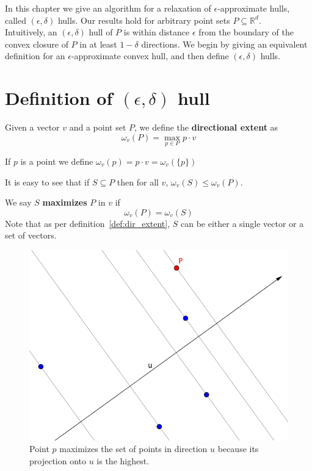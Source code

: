 
In this chapter we give an algorithm for a relaxation of $\epsilon$-approximate hulls, called $(\epsilon, \delta)$ hulls. Our results hold for arbitrary point sets $P \subseteq \mathbb{R}^d$.
\\

Intuitively, an $(\epsilon,\delta)$ hull of $P$ is within distance $\epsilon$ from the boundary of the convex closure of $P$ in at least $1-\delta$ directions. We begin by giving an equivalent definition for an $\epsilon$-approximate convex hull, and then define $(\epsilon,\delta)$ hulls.

\section{Definition of $(\epsilon, \delta)$ hull}

\begin{definition}
Given a vector $v$ and a point set $P$, we define the \textbf{directional extent} as
\[ \omega_v(P) = \max_{p \in P} p \cdot v \]
\label{def:dir_extent}
\end{definition}
\begin{definition}
If $p$ is a point we define $\omega_v(p) = p \cdot v = \omega_v(\{p\})$
\end{definition}

It is easy to see that if $S \subseteq P$ then for all $v$, $\omega_v(S) \leq \omega_v(P)$.

\begin{definition}
We say $S$ \textbf{maximizes} $P$ in $v$ if
\[ \omega_v(P) = \omega_v(S) \]
Note that as per definition~\ref{def:dir_extent}, $S$ can be either a single vector or a set of vectors.
\end{definition}

\begin{figure}[!htb]
\centering
\includegraphics[width=0.5\linewidth]{maximal_point}
\caption{Point $p$ maximizes the set of points in direction $u$ because its projection onto $u$ is the highest.}
\label{fig:maximal_point}
\end{figure}

